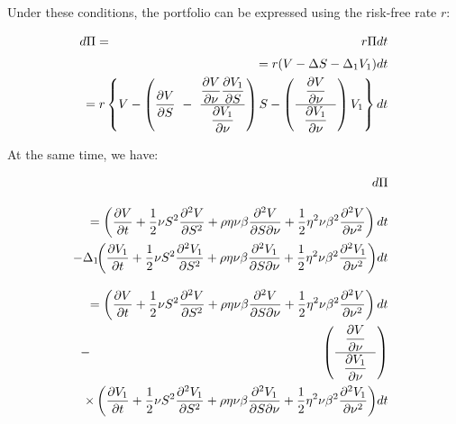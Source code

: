 \documentclass[uplatex,a4j,12pt,dvipdfmx]{jsarticle}
\begin{document}
Under these conditions, the portfolio can be expressed using the risk-free rate $r$:

\begin{eqnarray*}
	d \Pi
	&=&
	r \Pi dt
	\\[1mm] &&
	\hspace{-10mm}
	= r (V - \Delta S - \Delta_{1} V_{1}) dt
	\\ &&
	\hspace{-10mm}
	= r \left\{
	V -
	\left(
	\dfrac{\partial V}{\partial S}
	\ - \
	\dfrac{
		\dfrac{\partial V}{\partial \nu}
		\dfrac{\partial V_{1}}{\partial S}
	}{
		\dfrac{\partial V_{1}}{\partial \nu}
	}
	\right)
	S
	-
	\left(
	\dfrac{ \
		\dfrac{\partial V}{\partial \nu}
		\
	}{ \ \
		\dfrac{\partial V_{1}}{\partial \nu}
		\ \
	}
	\right)
	V_{1}
	\right\} dt
\end{eqnarray*}

At the same time, we have:

\begin{eqnarray*}
	&&
	\hspace{-5mm}
	d \Pi
	\\[3mm] &&
	\hspace{-10mm}
	=
	\left(
	\dfrac{\partial V}{\partial t}
	+
	\dfrac{1}{2}
	\nu S^{2}
	\dfrac{\partial^{2} V}{\partial S^{2}}
	+
	\rho \eta \nu \beta
	\dfrac{\partial^{2} V}{\partial S \partial \nu}
	+
	\dfrac{1}{2}
	\eta^{2} \nu \beta^{2}
	\dfrac{\partial^{2} V}{\partial \nu^{2}}
	\right)dt
	\\ && \hspace{-10mm} -
	\Delta_{1}
	\!\!
	\left(
	\dfrac{\partial V_{1}}{\partial t}
	+
	\dfrac{1}{2}
	\nu S^{2}
	\dfrac{\partial^{2} V_{1}}{\partial S^{2}}
	+
	\rho \eta \nu \beta
	\dfrac{\partial^{2} V_{1}}{\partial S \partial \nu}
	+
	\dfrac{1}{2}
	\eta^{2} \nu \beta^{2}
	\dfrac{\partial^{2} V_{1}}{\partial \nu^{2}}
	\right)
	\!
	dt
	\\[3mm] &&
	\hspace{-10mm}
	=
	\left(
	\dfrac{\partial V}{\partial t}
	+
	\dfrac{1}{2}
	\nu S^{2}
	\dfrac{\partial^{2} V}{\partial S^{2}}
	+
	\rho \eta \nu \beta
	\dfrac{\partial^{2} V}{\partial S \partial \nu}
	+
	\dfrac{1}{2}
	\eta^{2} \nu \beta^{2}
	\dfrac{\partial^{2} V}{\partial \nu^{2}}
	\right)dt
	\\ &-&
	\!\!\!\!
	\left(
	\dfrac{ \
		\dfrac{\partial V}{\partial \nu}
		\
	}{ \ \
		\dfrac{\partial V_{1}}{\partial \nu}
		\ \
	}
	\right)
	\\ &&
	\hspace{-5mm}
	\times
	\left(
	\dfrac{\partial V_{1}}{\partial t}
	+
	\dfrac{1}{2}
	\nu S^{2}
	\dfrac{\partial^{2} V_{1}}{\partial S^{2}}
	+
	\rho \eta \nu \beta
	\dfrac{\partial^{2} V_{1}}{\partial S \partial \nu}
	+
	\dfrac{1}{2}
	\eta^{2} \nu \beta^{2}
	\dfrac{\partial^{2} V_{1}}{\partial \nu^{2}}
	\right)
	\!
	dt
\end{eqnarray*}
\end{document}
